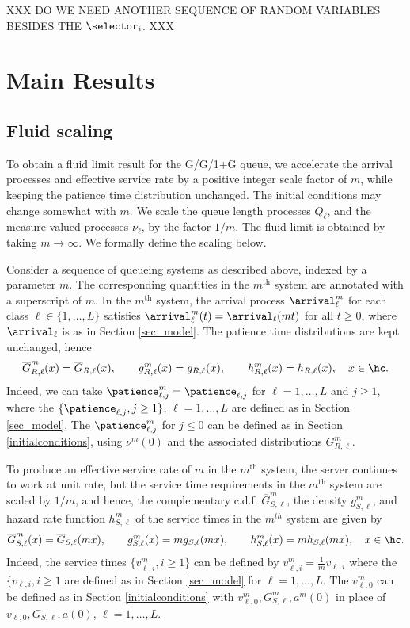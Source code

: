 \documentclass{article}
\begin{document}
XXX DO WE NEED ANOTHER SEQUENCE OF RANDOM VARIABLES BESIDES THE $\selector_i$. XXX




\section{Main Results}

\subsection{Fluid scaling}\label{sec_seq}

To obtain a fluid limit result for the G/G/1+G queue, we  accelerate the arrival processes and effective service rate by a positive integer scale factor of $m$, while keeping the patience time distribution unchanged. The initial conditions may change somewhat with $m$.  We  scale the queue length processes $Q_\ell$, and the measure-valued processes $\nu_\ell$, by the factor $1/m$. 
The fluid limit is obtained by taking $m\to\infty$. We formally define the scaling below. 

Consider a sequence of queueing systems as described above, indexed by a parameter $m$. The corresponding quantities in the $m^\text{th}$ system are annotated with a superscript of $m$. In the $m^\text{th}$ system,  the arrival process $\arrival^m_\ell$ for each class $\ell\in \{ 1, \ldots, L\}$ satisfies $\arrival^m_\ell(t)=\arrival_\ell(mt) $ for all $t\geq 0$, where $\arrival_\ell$ is as in Section
\ref{sec_model}.
 The patience time distributions are kept unchanged, hence
\[
    \overline G^m_{R,\ell}(x)=\overline G_{R,\ell}(x),\quad\quad g^m_{R,\ell}(x)=g_{R,\ell}(x),\quad\quad h^m_{R,\ell}(x)=h_{R,\ell}(x),\quad x\in\hc.
\]
Indeed, we can take $ \patience^m_{\ell, j}= \patience_{\ell, j}$ for $\ell =1, \ldots, L$ and $j\geq 1$, where the $\{\patience_{\ell, j}, j\geq 1 \}$, $\ell =1, \ldots, L$ are defined as in 
Section \ref{sec_model}. The $\patience^m_{\ell, j} $ for $j\leq 0$ can be defined as in Section \ref{initialconditions}, using $\nu^m(0)$ and the associated distributions $G^m_{R, \ell}$. 

To produce an effective service rate of $m$ in the $m^{\text{th}}$ system, the server continues to work at unit rate, but 
the service time requirements in the $m^\text{th}$ system are scaled by $1/m$, and hence, the complementary c.d.f. $\overline G^m_{S,\ell}$, the density $g^m_{S,\ell}$, and hazard rate function $h^m_{S,\ell}$ of the service times in the $m^{th}$ system are given by
\[
    \overline G^m_{S,\ell}(x)=\overline G_{S,\ell}(mx),\quad\quad g^m_{S,\ell}(x)=m g_{S,\ell}(mx),\quad\quad h^m_{S,\ell}(x)=mh_{S,\ell}(mx),\quad x\in\hc.
\]
Indeed, the service times $\{  v^m_{\ell, i} , i\geq 1\}$ can be defined by 
 $v^m_{\ell, i} =\frac{1}{m} v_{\ell, i}$ where the $\{v_{\ell, i}, i\geq 1$ are defined as in Section \ref{sec_model} for $\ell =1, \ldots, L$.
 The $ v^m_{\ell, 0} $ can be defined as in Section \ref{initialconditions} with $ v^m_{\ell, 0}, G^m_{S,\ell}, a^m(0)$  in place of $ v_{\ell, 0}, G_{S,\ell},a(0)$, $\ell =1, \ldots, L$.
\end{document}
